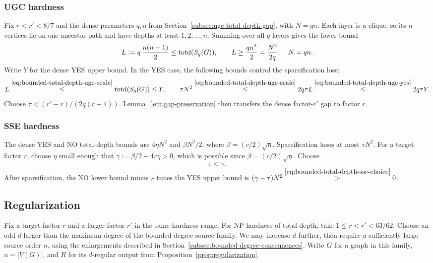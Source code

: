 \subsubsection{UGC hardness}
\label{app:transfer-total-ugc}
Fix $r<r'<8/7$ and the dense parameters $q,\eta$ from
Section~\ref{subsec:ugc-total-depth-gap}, with $N=qn$.
Each layer is a clique, so its $n$ vertices lie on one ancestor
path and have depths at least $1,2,\ldots,n$. Summing over all $q$
layers gives the lower bound
\begin{equation}\label{eq:bounded-total-depth-ugc-scale}
L:=q\,\frac{n(n+1)}2\le\operatorname{totd}(S_q(G)),
 \qquad L\ge\frac{qn^2}{2}=\frac{N^2}{2q},\quad N=qn.
\end{equation}
Write $Y$ for the dense YES upper bound. In the YES case, the following
bounds control the sparsification loss:
\begin{equation}\label{eq:bounded-total-depth-ugc-yes}
L\overset{\eqref{eq:bounded-total-depth-ugc-scale}}{\le}
 \operatorname{totd}(S_q(G))\le Y,\qquad \tau N^2
 \overset{\eqref{eq:bounded-total-depth-ugc-scale}}{\le}2q\tau L
 \overset{\eqref{eq:bounded-total-depth-ugc-yes}}{\le}2q\tau Y.
\end{equation}
Choose
$\tau<(r'-r)/(2q(r+1))$. Lemma~\ref{lem:gap-preservation} then
transfers the dense factor-$r'$ gap to factor $r$.

\subsubsection{SSE hardness}
\label{app:transfer-total-sse}
The dense YES and NO total-depth bounds are $4\eta N^2$ and
$\beta N^2/2$, where $\beta=(c/2)\sqrt\eta$. Sparsification loses
at most $\tau N^2$.
For a target factor $r$, choose $\eta$
small enough that $\gamma:=\beta/2-4r\eta>0$, which is possible
since $\beta=(c/2)\sqrt{\eta}$. Choose
\begin{equation}\label{eq:bounded-total-depth-sse-choice}
 \tau<\gamma.
\end{equation}
After
sparsification, the NO lower bound minus $r$ times the YES upper
bound is
$(\gamma-\tau)N^2\overset{\eqref{eq:bounded-total-depth-sse-choice}}{>}0$.

\subsection{Regularization}
\label{app:transfer-regular}
Fix a target factor $r$ and a larger factor $r'$ in the same
hardness range. For NP-hardness of total depth, take
$1\le r<r'<63/62$.
Choose an odd $d$ larger than the maximum degree of the
bounded-degree source family. We may increase $d$ further, then
require a sufficiently large source order $n$, using the
enlargements described in Section~\ref{subsec:bounded-degree-consequences}.
Write $G$ for a graph in this family, $n=|V(G)|$, and $R$ for its
$d$-regular output from Proposition~\ref{prop:regularization}.

